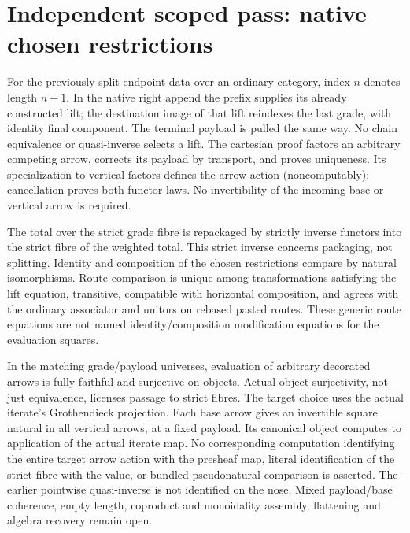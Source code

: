 \documentclass{article}
\begin{document}
\section*{Independent scoped pass: native chosen restrictions}
For the previously split endpoint data over an ordinary category, index $n$ denotes length $n+1$. In the native right append the prefix supplies its already constructed lift; the destination image of that lift reindexes the last grade, with identity final component. The terminal payload is pulled the same way. No chain equivalence or quasi-inverse selects a lift. The cartesian proof factors an arbitrary competing arrow, corrects its payload by transport, and proves uniqueness. Its specialization to vertical factors defines the arrow action (noncomputably); cancellation proves both functor laws. No invertibility of the incoming base or vertical arrow is required.
\par The total over the strict grade fibre is repackaged by strictly inverse functors into the strict fibre of the weighted total. This strict inverse concerns packaging, not splitting. Identity and composition of the chosen restrictions compare by natural isomorphisms. Route comparison is unique among transformations satisfying the lift equation, transitive, compatible with horizontal composition, and agrees with the ordinary associator and unitors on rebased pasted routes. These generic route equations are not named identity/composition modification equations for the evaluation squares.
\par In the matching grade/payload universes, evaluation of arbitrary decorated arrows is fully faithful and surjective on objects. Actual object surjectivity, not just equivalence, licenses passage to strict fibres. The target choice uses the actual iterate's Grothendieck projection. Each base arrow gives an invertible square natural in all vertical arrows, at a fixed payload. Its canonical object computes to application of the actual iterate map. No corresponding computation identifying the entire target arrow action with the presheaf map, literal identification of the strict fibre with the value, or bundled pseudonatural comparison is asserted. The earlier pointwise quasi-inverse is not identified on the nose. Mixed payload/base coherence, empty length, coproduct and monoidality assembly, flattening and algebra recovery remain open.
\end{document}
